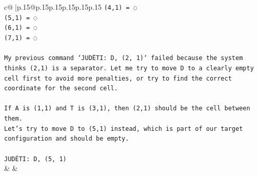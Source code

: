 \documentclass{article}
\begin{document}
{\begin{supertabular}{c@{$\;$}|p{.15\linewidth}@{}p{.15\linewidth}p{.15\linewidth}p{.15\linewidth}p{.15\linewidth}p{.15\linewidth}}
{{{\texttt{(4,1) = ◌} \\
\texttt{(5,1) = ◌} \\
\texttt{(6,1) = ◌} \\
\texttt{(7,1) = ◌} \\
\\ 
\texttt{My previous command `JUDĖTI: D, (2, 1)` failed because the system thinks (2,1) is a separator. Let me try to move D to a clearly empty cell first to avoid more penalties, or try to find the correct coordinate for the second cell.} \\
\\ 
\texttt{If A is (1,1) and T is (3,1), then (2,1) should be the cell between them.} \\
\texttt{Let's try to move D to (5,1) instead, which is part of our target configuration and should be empty.} \\
\\ 
\texttt{JUDĖTI: D, (5, 1)} \\
            }
        }
    }
    & & \\ \\


\end{supertabular}}
\end{document}
